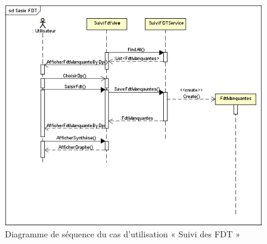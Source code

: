 \begin{figure}[h!]  
 \centering
    \includegraphics{chapitre4/Figures/suivifdt.png}
  \caption{Diagramme de séquence du cas d'utilisation « Suivi des FDT »}
\end{figure}